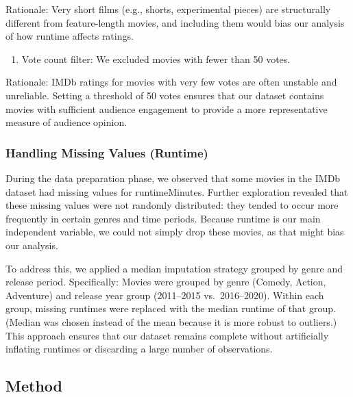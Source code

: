 \documentclass[
]{article}
\providecommand{\tightlist}{%
  \setlength{\itemsep}{0pt}\setlength{\parskip}{0pt}}
\begin{document}
Rationale: Very short films (e.g., shorts, experimental pieces) are
structurally different from feature-length movies, and including them
would bias our analysis of how runtime affects ratings.

\begin{enumerate}
\def\labelenumi{\arabic{enumi})}
\setcounter{enumi}{1}
\tightlist
\item
  Vote count filter: We excluded movies with fewer than 50 votes.
\end{enumerate}

Rationale: IMDb ratings for movies with very few votes are often
unstable and unreliable. Setting a threshold of 50 votes ensures that
our dataset contains movies with sufficient audience engagement to
provide a more representative measure of audience opinion.

\subsubsection{Handling Missing Values
(Runtime)}\label{handling-missing-values-runtime}

During the data preparation phase, we observed that some movies in the
IMDb dataset had missing values for runtimeMinutes. Further exploration
revealed that these missing values were not randomly distributed: they
tended to occur more frequently in certain genres and time periods.
Because runtime is our main independent variable, we could not simply
drop these movies, as that might bias our analysis.

To address this, we applied a median imputation strategy grouped by
genre and release period. Specifically: Movies were grouped by genre
(Comedy, Action, Adventure) and release year group (2011--2015
vs.~2016--2020). Within each group, missing runtimes were replaced with
the median runtime of that group. (Median was chosen instead of the mean
because it is more robust to outliers.) This approach ensures that our
dataset remains complete without artificially inflating runtimes or
discarding a large number of observations.

\subsection{Method}\label{method}
\end{document}
